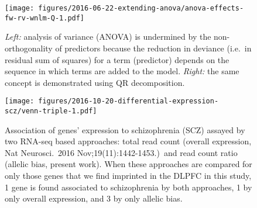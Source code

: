 \documentclass[letterpaper]{article}
\begin{document}
\begin{figure}[h]
\begin{center}
\texttt{[image: figures/2016-06-22-extending-anova/anova-effects-fw-rv-wnlm-Q-1.pdf]}
\end{center}
\caption{
\emph{Left:} analysis of variance (ANOVA) is undermined by the non-orthogonality of
predictors because the reduction in deviance (i.e.~in residual sum of squares)
for a term (predictor) depends on the sequence in which terms are added to the
model.  \emph{Right:} the same concept is demonstrated using QR decomposition.
}
\label{fig:anova}
\end{figure}

\begin{figure}[h]
\begin{center}
\texttt{[image: figures/2016-10-20-differential-expression-scz/venn-triple-1.pdf]}
\end{center}
\caption{
Association of genes' expression to schizophrenia (SCZ) assayed by two RNA-seq
based approaches: total read count (overall expression, Nat Neurosci.~2016
Nov;19(11):1442-1453.)~and read count ratio
(allelic bias, present work).  When these approaches are compared for only
those genes that we find imprinted in the DLPFC in this study, 1 gene is found
associated to schizophrenia by both approaches, 1 by only overall expression,
and 3 by only allelic bias.
}
\label{fig:diff-exp-scz}
\end{figure}

\end{document}
